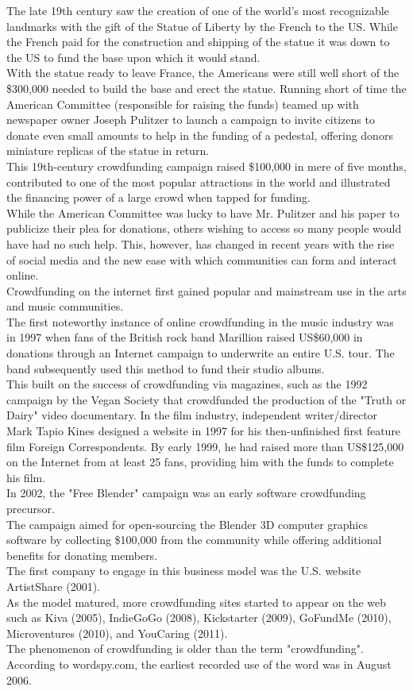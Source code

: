 The late 19th century saw the creation of one of the world’s most recognizable landmarks with the gift of the Statue of Liberty by the French to the US. While the French paid for the construction and shipping of the statue it was down to the US to fund the base upon which it would stand.\\
With the statue ready to leave France, the Americans were still well short of the \$300,000 needed to build the base and erect the statue. Running short of time the American Committee (responsible for raising the funds) teamed up with newspaper owner Joseph Pulitzer to launch a campaign to invite citizens to donate even small amounts to help in the funding of a pedestal, offering donors miniature replicas of the statue in return.\\
This 19th-century crowdfunding campaign raised \$100,000 in mere of five months, contributed to one of the most popular attractions in the world and illustrated the financing power of a large crowd when tapped for funding.\\
While the American Committee was lucky to have Mr. Pulitzer and his paper to publicize their plea for donations, others wishing to access so many people would have had no such help. This, however, has changed in recent years with the rise of social media and the new ease with which communities can form and interact online.\\
Crowdfunding on the internet first gained popular and mainstream use in the arts and music communities.\\
The first noteworthy instance of online crowdfunding in the music industry was in 1997 when fans of the British rock band Marillion raised US\$60,000 in donations through an Internet campaign to underwrite an entire U.S. tour. The band subsequently used this method to fund their studio albums.\\
This built on the success of crowdfunding via magazines, such as the 1992 campaign by the Vegan Society that crowdfunded the production of the "Truth or Dairy" video documentary.
In the film industry, independent writer/director Mark Tapio Kines designed a website in 1997 for his then-unfinished first feature film Foreign Correspondents. By early 1999, he had raised more than US\$125,000 on the Internet from at least 25 fans, providing him with the funds to complete his film.\\
In 2002, the "Free Blender" campaign was an early software crowdfunding precursor.\\
The campaign aimed for open-sourcing the Blender 3D computer graphics software by collecting \$100,000 from the community while offering additional benefits for donating members.\\
The first company to engage in this business model was the U.S. website ArtistShare (2001).\\
As the model matured, more crowdfunding sites started to appear on the web such as Kiva (2005), IndieGoGo (2008), Kickstarter (2009), GoFundMe (2010), Microventures (2010), and YouCaring (2011).\\
The phenomenon of crowdfunding is older than the term "crowdfunding". According to wordspy.com, the earliest recorded use of the word was in August 2006.
